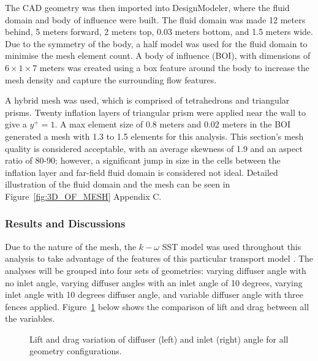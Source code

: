 \noindent The CAD geometry was then imported into DesignModeler, where the fluid domain and body of influence were built. The fluid domain was made 12 meters behind, 5 meters forward, 2 meters top, 0.03 meters bottom, and 1.5 meters wide. Due to the symmetry of the body, a half model was used for the fluid domain to minimise the mesh element count. A body of influence (BOI), with dimensions of  $6 \times 1 \times 7$ meters was created using a box feature around the body to increase the mesh density and capture the surrounding flow features.  %

\noindent A hybrid mesh was used, which is comprised of tetrahedrons and triangular prisms. Twenty inflation layers of triangular prism were applied near the wall to give a $y^+=1$. A max element size of 0.8 meters and 0.02 meters in the BOI generated a mesh with 1.3 to 1.5 elements for this analysis. This section's mesh quality is considered acceptable, with an average skewness of 1.9 and an aspect ratio of 80-90; however, a significant jump in size in the cells between the inflation layer and far-field fluid domain is considered not ideal. Detailed illustration of the fluid domain and the mesh can be seen in Figure~\ref{fig:3D_OF_MESH} Appendix C.

\subsubsection{Results and Discussions}
Due to the nature of the mesh, the $k-\omega$ SST model was used throughout this analysis to take advantage of the features of this particular transport model \cite{Ansys2006ModelingFlows}. The analyses will be grouped into four sets of geometries: varying diffuser angle with no inlet angle, varying diffuser angles with an inlet angle of 10 degrees, varying inlet angle with 10 degrees diffuser angle, and variable diffuser angle with three fences applied. Figure~\ref{fig:3D_OF_PLOT_COMPARE_ALL} below shows the comparison of lift and drag between all the variables.

\begin{figure}[htb!]
    \centering
    \noindent{}
    \caption{Lift and drag variation of diffuser (left) and inlet (right) angle for all geometry configurations.}
    \label{fig:3D_OF_PLOT_COMPARE_ALL}
\end{figure}


